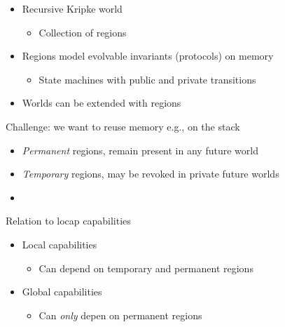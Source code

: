 \documentclass{beamer}
\begin{document}
\begin{frame}
\begin{overprint}
  \end{overprint}
  \begin{overprint}
    \begin{itemize}
    \item Recursive Kripke world
      \begin{itemize}
      \item Collection of regions
      \end{itemize}
    \item Regions model evolvable invariants (protocols) on memory
      \begin{itemize}
      \item State machines with public and private transitions
      \end{itemize}
    \item<3-> Worlds can be extended with regions
    \end{itemize}
    Challenge: we want to reuse memory e.g., on the stack
      \begin{itemize}
      \item \emph{Permanent} regions, remain present in any future world
      \item \emph{Temporary} regions, may be revoked in private future worlds
      \item {}
      \end{itemize}
    Relation to locap capabilities
    \begin{itemize}
    \item<9-> Local capabilities
      \begin{itemize}
      \item Can depend on temporary and permanent regions
      \end{itemize}
    \item<10-> Global capabilities
      \begin{itemize}
      \item Can \emph{only} depen on permanent regions
      \end{itemize}
    \end{itemize}
  \end{overprint}
\end{frame}
\end{document}
